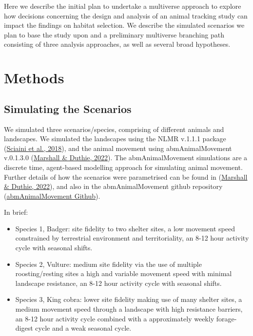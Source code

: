 \documentclass[10pt,a4paper]{article}
\begin{document}
Here we describe the initial plan to undertake a multiverse approach to explore how decisions concerning the design and analysis of an animal tracking study can impact the findings on habitat selection.
We describe the simulated scenarios we plan to base the study upon and a preliminary multiverse branching path consisting of three analysis approaches, as well as several broad hypotheses.

\hypertarget{methods}{%
\section{Methods}\label{methods}}

\hypertarget{simulating-the-scenarios}{%
\subsection{Simulating the Scenarios}\label{simulating-the-scenarios}}

We simulated three scenarios/species, comprising of different animals and landscapes.
We simulated the landscapes using the NLMR v.1.1.1 package (\protect\hyperlink{ref-NLMR}{Sciaini et al., 2018}), and the animal movement using abmAnimalMovement v.0.1.3.0 (\protect\hyperlink{ref-abmAnimalMovement}{Marshall \& Duthie, 2022}).
The abmAnimalMovement simulations are a discrete time, agent-based modelling approach for simulating animal movement.
Further details of how the scenarios were parametrised can be found in (\protect\hyperlink{ref-abmAnimalMovement}{Marshall \& Duthie, 2022}), and also in the abmAnimalMovement github repository (\href{https://github.com/BenMMarshall/abmAnimalMovement/tree/main/notebook/manuscript}{abmAnimalMovement Github}).

In brief:

\begin{itemize}
\item
  Species 1, Badger: site fidelity to two shelter sites, a low movement speed constrained by terrestrial environment and territoriality, an 8-12 hour activity cycle with seasonal shifts.
\item
  Species 2, Vulture: medium site fidelity via the use of multiple roosting/resting sites a high and variable movement speed with minimal landscape resistance, an 8-12 hour activity cycle with seasonal shifts.
\item
  Species 3, King cobra: lower site fidelity making use of many shelter sites, a medium movement speed through a landscape with high resistance barriers, an 8-12 hour activity cycle combined with a approximately weekly forage-digest cycle and a weak seasonal cycle.
\end{itemize}
\end{document}
